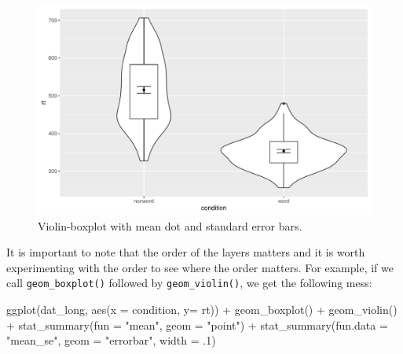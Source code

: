 \documentclass[
  english,
  doc,floatsintext]{apa6}
\newenvironment{Shaded}{\begin{snugshade}}{\end{snugshade}}
\newcommand{\AttributeTok}[1]{\textcolor[rgb]{0.77,0.63,0.00}{#1}}
\newcommand{\DecValTok}[1]{\textcolor[rgb]{0.00,0.00,0.81}{#1}}
\newcommand{\FunctionTok}[1]{\textcolor[rgb]{0.00,0.00,0.00}{#1}}
\newcommand{\NormalTok}[1]{#1}
\newcommand{\SpecialCharTok}[1]{\textcolor[rgb]{0.00,0.00,0.00}{#1}}
\newcommand{\StringTok}[1]{\textcolor[rgb]{0.31,0.60,0.02}{#1}}
\begin{document}
\begin{figure}

{\centering \includegraphics[width=1\linewidth]{images/viobox1-1} 

}

\caption{Violin-boxplot with mean dot and standard error bars.}\label{fig:viobox1}
\end{figure}

It is important to note that the order of the layers matters and it is worth experimenting with the order to see where the order matters. For example, if we call \texttt{geom\_boxplot()} followed by \texttt{geom\_violin()}, we get the following mess:

\begin{Shaded}
\begin{Highlighting}[]
\FunctionTok{ggplot}\NormalTok{(dat\_long, }\FunctionTok{aes}\NormalTok{(}\AttributeTok{x =}\NormalTok{ condition, }\AttributeTok{y=}\NormalTok{ rt)) }\SpecialCharTok{+}
  \FunctionTok{geom\_boxplot}\NormalTok{() }\SpecialCharTok{+}  
  \FunctionTok{geom\_violin}\NormalTok{() }\SpecialCharTok{+}
  \FunctionTok{stat\_summary}\NormalTok{(}\AttributeTok{fun =} \StringTok{"mean"}\NormalTok{,  }\AttributeTok{geom =} \StringTok{"point"}\NormalTok{) }\SpecialCharTok{+}
  \FunctionTok{stat\_summary}\NormalTok{(}\AttributeTok{fun.data =} \StringTok{"mean\_se"}\NormalTok{, }
               \AttributeTok{geom =} \StringTok{"errorbar"}\NormalTok{, }
               \AttributeTok{width =}\NormalTok{ .}\DecValTok{1}\NormalTok{)}
\end{Highlighting}
\end{Shaded}
\end{document}
